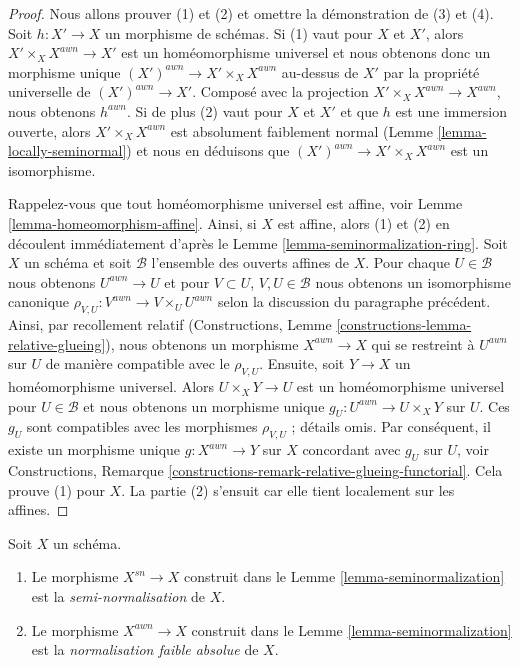 \begin{proof}
Nous allons prouver (1) et (2) et omettre la démonstration
de (3) et (4). Soit $h : X' \to X$ un morphisme de schémas. Si (1)
vaut pour $X$ et $X'$, alors $X' \times_X X^{awn} \to X'$ est un homéomorphisme
universel et nous obtenons donc un morphisme unique $(X')^{awn} \to X' \times_X X^{awn}$
au-dessus de $X'$ par la propriété universelle de $(X')^{awn} \to X'$.
Composé avec la projection $X' \times_X X^{awn} \to X^{awn}$, nous obtenons $h^{awn}$.
Si de plus (2) vaut pour $X$ et $X'$ et que $h$ est
une immersion ouverte, alors $X' \times_X X^{awn}$ est
absolument faiblement normal (Lemme \ref{lemma-locally-seminormal}) et nous
en déduisons que $(X')^{awn} \to X' \times_X X^{awn}$ est un isomorphisme.

\medskip\noindent
Rappelez-vous que tout homéomorphisme universel
est affine, voir Lemme \ref{lemma-homeomorphism-affine}. Ainsi, si $X$
est affine, alors (1) et (2) en découlent
immédiatement d'après le Lemme \ref{lemma-seminormalization-ring}.
Soit $X$ un schéma et soit $\mathcal{B}$ l'ensemble
des ouverts affines de $X$. Pour chaque $U \in \mathcal{B}$
nous obtenons $U^{awn} \to U$ et pour $V \subset U$, $V, U \in \mathcal{B}$
nous obtenons un isomorphisme canonique $\rho_{V, U} : V^{awn} \to V \times_U U^{awn}$ selon la discussion
du paragraphe précédent. Ainsi, par recollement
relatif (Constructions, Lemme \ref{constructions-lemma-relative-glueing}), nous obtenons
un morphisme $X^{awn} \to X$ qui se restreint
à $U^{awn}$ sur $U$ de manière compatible avec le
$\rho_{V, U}$. Ensuite, soit $Y \to X$ un homéomorphisme
universel. Alors $U \times_X Y \to U$ est un homéomorphisme universel pour $U \in \mathcal{B}$
et nous obtenons un morphisme unique $g_U : U^{awn} \to U \times_X Y$ sur $U$. Ces $g_U$
sont compatibles avec les morphismes $\rho_{V, U}$ ; détails omis.
Par conséquent, il existe un morphisme unique $g : X^{awn} \to Y$ sur
$X$ concordant avec $g_U$ sur
$U$, voir Constructions, Remarque \ref{constructions-remark-relative-glueing-functorial}. Cela prouve (1) pour $X$.
La partie (2) s'ensuit car elle tient localement sur les affines.
\end{proof}

\begin{definition}
\label{definition-seminormalization}
Soit $X$ un schéma.
\begin{enumerate}
\item Le morphisme $X^{sn} \to X$ construit dans le Lemme \ref{lemma-seminormalization}
est la {\it semi-normalisation}
de $X$.
\item Le morphisme $X^{awn} \to X$ construit dans le Lemme \ref{lemma-seminormalization}
est la {\it normalisation
faible absolue} de $X$.
\end{enumerate}
\end{definition}

